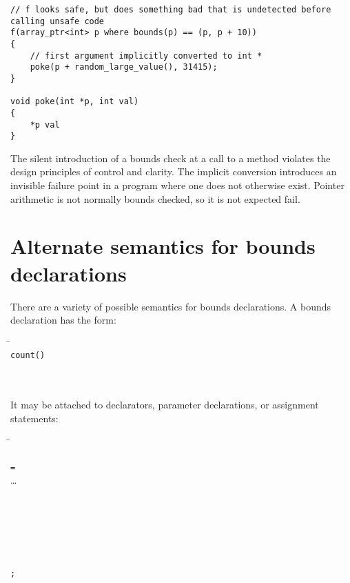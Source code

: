 \begin{verbatim}
// f looks safe, but does something bad that is undetected before calling unsafe code
f(array_ptr<int> p where bounds(p) == (p, p + 10))
{
    // first argument implicitly converted to int *
    poke(p + random_large_value(), 31415);  
}

void poke(int *p, int val)
{
    *p val
}
\end{verbatim}

The silent introduction of a bounds check at a call to a method violates
the design principles of control and clarity. The implicit conversion
introduces an invisible failure point in a program where one does not
otherwise exist. Pointer arithmetic is not normally bounds checked, so
it is not expected fail.

\section{Alternate semantics for bounds declarations}
\label{section:bounds-declarations-alternate-semantics}

There are a variety of possible semantics for
bounds declarations. A bounds declaration has the form:

\begin{quote}
\end{quote}

\begin{tabbing}
\= \\
\> \texttt{count(}\texttt{)} \\
\>  \\
\> \boundsnone \\
\> \boundsany
\end{tabbing}

It may be attached to declarators, parameter declarations, or assignment statements:

\begin{tabbing}
\= \\
\> \\
\> \texttt{=}  \\
\>\ldots{} \\
\\
 \\
\> \\
\> \\
\\
\\
\>\texttt{;}
\end{tabbing}

